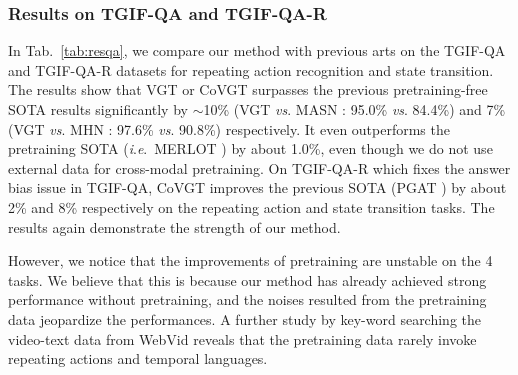 \documentclass[10pt,journal,compsoc]{IEEEtran}
\newcommand{\vs}{\textit{vs}. }
\newcommand{\ie}{\textit{i}.\textit{e}.}
\begin{document}
\subsubsection{Results on TGIF-QA and TGIF-QA-R}
In Tab.~\ref{tab:resqa}, we compare our method with previous arts on the TGIF-QA \cite{jang2017tgif} and TGIF-QA-R \cite{peng2021progressive} datasets for repeating action recognition and state transition. The results show that VGT or CoVGT surpasses the previous pretraining-free SOTA results significantly by  $\sim$10\% (VGT \vs MASN \cite{seo2021attend}: 95.0\% \vs 84.4\%) and 7\% (VGT \vs MHN \cite{peng2022multilevel}: 97.6\% \vs 90.8\%) respectively. It even outperforms the pretraining SOTA (\ie~MERLOT \cite{zellers2021merlot}) by about 1.0\%, even though we do not use external data for cross-modal pretraining. On TGIF-QA-R \cite{peng2021progressive} which fixes the answer bias issue in TGIF-QA, CoVGT improves the previous SOTA (PGAT \cite{peng2021progressive}) by about 2\% and 8\% respectively on the repeating action and state transition tasks. The results again demonstrate the strength of our method. 

However, we notice that the improvements of pretraining are unstable on the 4 tasks. We believe that this is because our method has already achieved strong performance without pretraining, and the noises resulted from the pretraining data jeopardize the performances.
A further study by key-word searching the video-text data from WebVid \cite{bain2021frozen} reveals that the pretraining data rarely invoke repeating actions and temporal languages. 
\end{document}
